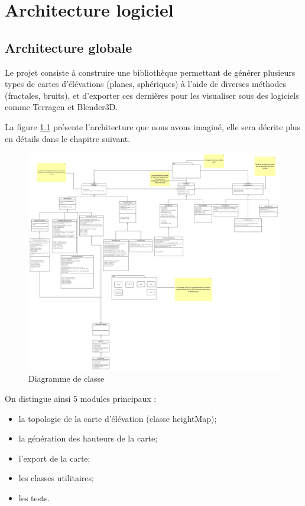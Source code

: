 \chapter{Architecture logiciel}

\section{Architecture globale}

Le projet consiste à construire une bibliothèque permettant de générer plusieurs
types de cartes d'élévations (planes, sphériques) à l'aide de diverses
méthodes (fractales, bruits), et d'exporter ces dernières pour les visualiser sous des logiciels 
comme Terragen et Blender3D.

La figure \ref{fig:class-diagram} présente l'architecture que nous avons imaginé,
elle sera décrite plus en détails dans le chapitre suivant.

\begin{figure}
  \includegraphics[width=20cm]{resources/Diag_Planetgen_v5.png}
        \caption{Diagramme de classe}
        \label{fig:class-diagram}
\end{figure}

On distingue ainsi 5 modules principaux :
\begin{itemize}
 \item la topologie de la carte d'élévation (classe heightMap);
 \item la génération des hauteurs de la carte;
 \item l'export de la carte;
 \item les classes utilitaires;
 \item les tests.
\end{itemize}

